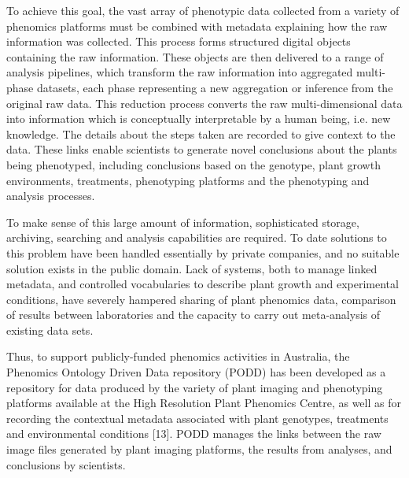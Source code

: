 \documentclass{llncs}
\begin{document}
To achieve this goal, the vast array of phenotypic data collected from a variety
of phenomics platforms must be combined with metadata explaining how the raw
information was collected. This process forms structured digital objects
containing the raw information. These objects are then delivered to a range of
analysis pipelines, which transform the raw information into  aggregated
multi-phase datasets, each phase representing a new aggregation or inference
from the original raw data. This reduction process converts the raw
multi-dimensional data into information which is conceptually interpretable by a
human being, i.e. new knowledge. The details about the steps taken are recorded
to give context to the data. These links enable scientists to generate novel
conclusions about the plants being phenotyped, including conclusions based on
the genotype, plant growth environments, treatments, phenotyping platforms and
the phenotyping and analysis processes.


To make sense of this large amount of information, sophisticated storage,
archiving, searching and analysis capabilities are required. To date solutions
to this problem have been handled essentially by private companies, and no
suitable solution exists in the public domain. Lack of systems, both to manage
linked metadata, and controlled vocabularies to describe plant growth and
experimental conditions, have severely hampered sharing of plant phenomics data,
comparison of results between laboratories and the capacity to carry out
meta-analysis of existing data sets.


Thus, to support publicly-funded phenomics activities in Australia, the
Phenomics Ontology Driven Data repository (PODD) has been developed as a
repository for data produced by the variety of plant imaging and phenotyping
platforms available at the High Resolution Plant Phenomics Centre, as well as
for recording the contextual metadata associated with plant genotypes,
treatments and environmental conditions [13]. PODD manages the links between the
raw image files generated by plant imaging platforms, the results from analyses,
and conclusions by scientists.
\end{document}
